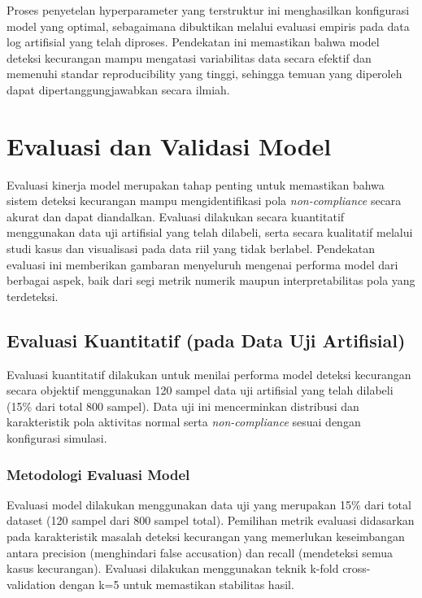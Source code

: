 Proses penyetelan hyperparameter yang terstruktur ini menghasilkan konfigurasi model yang optimal, sebagaimana dibuktikan melalui evaluasi empiris pada data log artifisial yang telah diproses. Pendekatan ini memastikan bahwa model deteksi kecurangan mampu mengatasi variabilitas data secara efektif dan memenuhi standar reproducibility yang tinggi, sehingga temuan yang diperoleh dapat dipertanggungjawabkan secara ilmiah.

\section{Evaluasi dan Validasi Model}
\label{sec:strategiEvaluasiKinerjaModel}
Evaluasi kinerja model merupakan tahap penting untuk memastikan bahwa sistem deteksi kecurangan mampu mengidentifikasi pola \textit{non-compliance} secara akurat dan dapat diandalkan. Evaluasi dilakukan secara kuantitatif menggunakan data uji artifisial yang telah dilabeli, serta secara kualitatif melalui studi kasus dan visualisasi pada data riil yang tidak berlabel. Pendekatan evaluasi ini memberikan gambaran menyeluruh mengenai performa model dari berbagai aspek, baik dari segi metrik numerik maupun interpretabilitas pola yang terdeteksi.

\subsection{Evaluasi Kuantitatif (pada Data Uji Artifisial)}
\label{sec:evaluasiKuantitatifDataUjiArtifisial}
Evaluasi kuantitatif dilakukan untuk menilai performa model deteksi kecurangan secara objektif menggunakan 120 sampel data uji artifisial yang telah dilabeli (15\% dari total 800 sampel). Data uji ini mencerminkan distribusi dan karakteristik pola aktivitas normal serta \textit{non-compliance} sesuai dengan konfigurasi simulasi. 

\subsubsection{Metodologi Evaluasi Model}
Evaluasi model dilakukan menggunakan data uji yang merupakan 15\% dari total dataset (120 sampel dari 800 sampel total). Pemilihan metrik evaluasi didasarkan pada karakteristik masalah deteksi kecurangan yang memerlukan keseimbangan antara precision (menghindari false accusation) dan recall (mendeteksi semua kasus kecurangan). Evaluasi dilakukan menggunakan teknik k-fold cross-validation dengan k=5 untuk memastikan stabilitas hasil.


